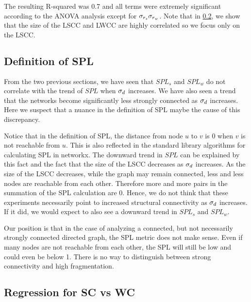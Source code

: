 The resulting R-squared was 0.7 and all terms were extremely significant
according to the ANOVA analysis except for $\sigma_{r_s}\sigma_{r_w}$.
Note that in \ref{subsec:scwcreg}, we show that the size of the LSCC and LWCC
are highly correlated so we focus only on the LSCC.

\subsection{Definition of SPL}
From the two previous sections, we have seen that $SPL_s$ and $SPL_w$ do not
correlate with the trend of $SPL$ when $\sigma_d$ increases.
We have also seen a trend that the networks become significantly less
strongly connected as $\sigma_d$ increases.
Here we suspect that a nuance in the definition of SPL maybe the cause of this
discrepancy.

Notice that in the definition of SPL, the distance from node $u$ to $v$ is 0 when
$v$ is not reachable from $u$.
This is also reflected in the standard library algorithms for calculating
SPL in networkx.
The downward trend in $SPL$ can be explained by this fact and the fact that
the size of the LSCC decreases as $\sigma_d$ increases.
As the size of the LSCC decreases, while the graph may remain connected,
less and less nodes are reachable from each other.
Therefore more and more pairs in the summation of the SPL calculation are 0.
Hence, we do not think that these experiments necessarily point to
increased structural connectivity as $\sigma_d$ increases.
If it did, we would expect to also see a downward trend in $SPL_s$ and $SPL_w$.

Our position is that in the case of analyzing a connected, but not necessarily
strongly connected directed graph, the SPL metric does not make sense.
Even if many nodes are not reachable from each other, the SPL will still be
low and could even be below 1.
There is no way to distinguish between strong connectivity and high
fragmentation.

\subsection{Regression for SC vs WC} \label{subsec:scwcreg}

